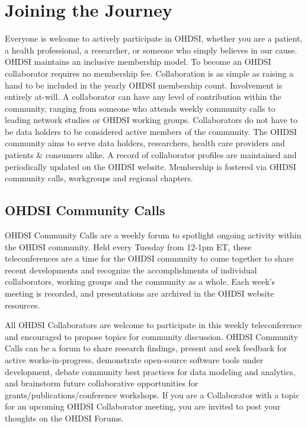 \documentclass[11pt]{book}
\theoremstyle{definition}
\theoremstyle{definition}
\theoremstyle{definition}
\theoremstyle{remark}
\begin{document}
\hypertarget{joining-the-journey}{%
\section{Joining the Journey}\label{joining-the-journey}}

Everyone is welcome to actively participate in OHDSI, whether you are a patient, a health professional, a researcher, or someone who simply believes in our cause. OHDSI maintains an inclusive membership model. To become an OHDSI collaborator requires no membership fee. Collaboration is as simple as raising a hand to be included in the yearly OHDSI membership count. Involvement is entirely at-will. A collaborator can have any level of contribution within the community, ranging from someone who attends weekly community calls to leading network studies or OHDSI working groups. Collaborators do not have to be data holders to be considered active members of the community. The OHDSI community aims to serve data holders, researchers, health care providers and patients \& consumers alike. A record of collaborator profiles are maintained and periodically updated on the OHDSI website. Membership is fostered via OHDSI community calls, workgroups and regional chapters.

\hypertarget{ohdsi-community-calls}{%
\subsection{OHDSI Community Calls}\label{ohdsi-community-calls}}

OHDSI Community Calls are a weekly forum to spotlight ongoing activity within the OHDSI community. Held every Tuesday from 12-1pm ET, these teleconferences are a time for the OHDSI community to come together to share recent developments and recognize the accomplishments of individual collaborators, working groups and the community as a whole. Each week's meeting is recorded, and presentations are archived in the OHDSI website resources.

All OHDSI Collaborators are welcome to participate in this weekly teleconference and encouraged to propose topics for community discussion. OHDSI Community Calls can be a forum to share research findings, present and seek feedback for active works-in-progress, demonstrate open-source software tools under development, debate community best practices for data modeling and analytics, and brainstorm future collaborative opportunities for grants/publications/conference workshops. If you are a Collaborator with a topic for an upcoming OHDSI Collaborator meeting, you are invited to post your thoughts on the OHDSI Forums.
\end{document}
